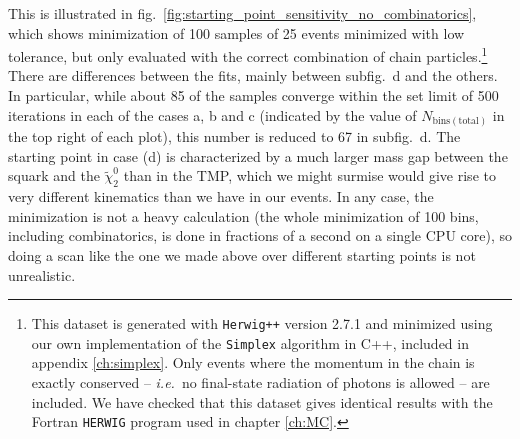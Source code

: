 \documentclass[twoside,english]{uiofysmaster}
\begin{document}
This is illustrated in fig.\ \ref{fig:starting_point_sensitivity_no_combinatorics}, which shows minimization of 100 samples of 25 events minimized with low tolerance, but only evaluated with the correct combination of chain particles.\footnote{This dataset is generated with {\tt Herwig++} version 2.7.1 \cite{Bahr:2008pv} and minimized using our own implementation of the {\tt Simplex} algorithm in C++, included in appendix \ref{ch:simplex}. Only events where the momentum in the chain is exactly conserved -- {\it i.e.}\ no final-state radiation of photons is allowed -- are included. We have checked that this dataset gives identical results with the Fortran {\tt HERWIG} program used in chapter \ref{ch:MC}.} There are differences between the fits, mainly between subfig.\ d and the others. In particular, while about 85 of the samples converge within the set limit of 500 iterations in each of the cases a, b and c (indicated by the value of $N_\mathrm{bins(total)}$ in the top right of each plot), this number is reduced to 67 in subfig.\ d. The starting point in case (d) is characterized by a much larger mass gap between the squark and the $\tilde\chi_2^0$ than in the TMP, which we might surmise would give rise to very different kinematics than we have in our events. In any case, the minimization is not a heavy calculation (the whole minimization of 100 bins, including combinatorics, is done in fractions of a second on a single CPU core), so doing a scan like the one we made above over different starting points is not unrealistic.
\end{document}
